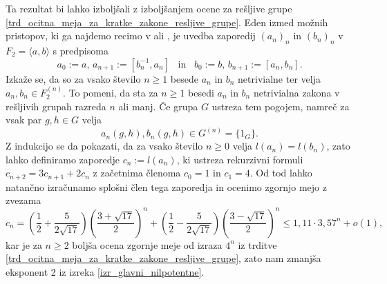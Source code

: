  Ta rezultat bi lahko izboljšali z izboljšanjem ocene za rešljive grupe \ref{trd_ocitna_meja_za_kratke_zakone_resljive_grupe}. Eden izmed možnih pristopov, ki ga najdemo recimo v \cite[str.~4--5]{Elkasapy_Thom_2013} ali \cite[str.~14--16]{Schneider_2016}, je uvedba zaporedij $(a_n)_n$ in $(b_n)_n$ v $F_2 = \langle a, b \rangle$ s predpisoma
\begin{equation*}
a_0 := a, \, a_{n + 1} := [b_n^{-1}, a_{n}] \,\,\, \text{ in } \,\,\, b_0 := b, \, b_{n + 1} := [a_{n}, b_{n}]. 
\end{equation*}  
Izkaže se, da so za vsako število $n \ge 1$ besede $a_n$ in $b_n$ netrivialne ter velja $a_n, b_n \in F_2^{(n)}$. To pomeni, da sta za $n \ge 1$ besedi $a_n$ in $b_n$ netrivialna zakona v rešljivih grupah razreda $n$ ali manj. Če grupa $G$ ustreza tem pogojem, namreč za vsak par $g, h \in G$ velja \begin{equation*}
    a_n(g, h), b_n(g, h ) \in G^{(n)} = \{ 1_G  \}.
\end{equation*}
Z indukcijo se da pokazati, da za vsako število $n \ge 0$ velja $l(a_n) = l(b_n)$, zato lahko definiramo zaporedje
$c_n := l(a_n)$, ki ustreza rekurzivni formuli $c_{n+2} = 3 c_{n+1} + 2c_{n}$ z začetnima členoma $c_0 = 1$ in $c_1 = 4$. Od tod lahko natančno izračunamo splošni člen tega zaporedja in ocenimo zgornjo mejo z zvezama \begin{equation*}
c_{n} = \left( \frac{1}{2} + \frac{5}{2 \sqrt{17}} \right) \left( \frac{3 + \sqrt{17} }{2} \right)^{n} +  \left( \frac{1}{2} - \frac{5}{2 \sqrt{17}} \right) \left( \frac{3 - \sqrt{17} }{2} \right)^{n} \le 1{,}11 \cdot 3{,}57^{n} + o(1),
\end{equation*}
kar je za $n \ge 2$ boljša ocena zgornje meje od izraza $4^n$ iz trditve \ref{trd_ocitna_meja_za_kratke_zakone_resljive_grupe},
zato nam zmanjša eksponent 2 iz izreka \ref{izr_glavni_nilpotentne}.
 

